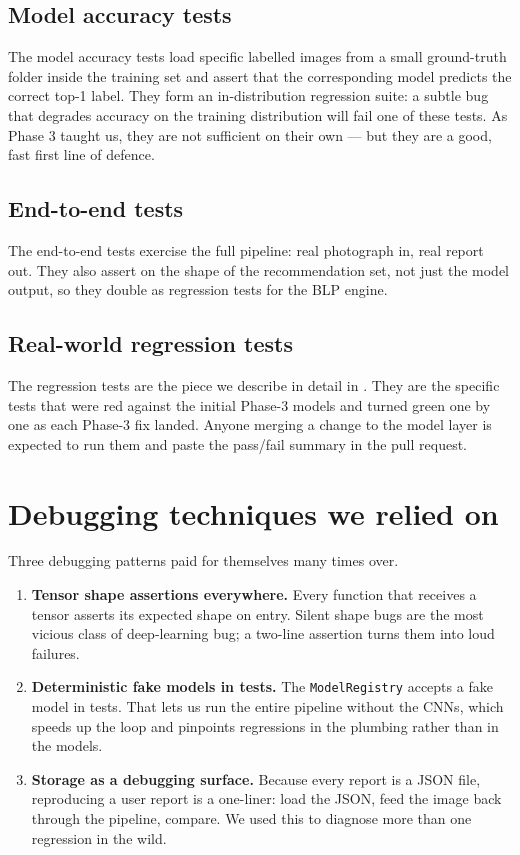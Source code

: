 \documentclass[11pt,a4paper,oneside]{report}
\begin{document}
\subsection{Model accuracy tests}
The model accuracy tests load specific labelled images from a
small ground-truth folder inside the training set and assert that
the corresponding model predicts the correct top-1 label. They
form an in-distribution regression suite: a subtle bug that
degrades accuracy on the training distribution will fail one of
these tests. As Phase 3 taught us, they are not sufficient on
their own --- but they are a good, fast first line of defence.

\subsection{End-to-end tests}
The end-to-end tests exercise the full pipeline: real photograph
in, real report out. They also assert on the shape of the
recommendation set, not just the model output, so they double as
regression tests for the BLP engine.

\subsection{Real-world regression tests}
The regression tests are the piece we describe in detail in
. They are the specific tests that were red
against the initial Phase-3 models and turned green one by one as
each Phase-3 fix landed. Anyone merging a change to the model
layer is expected to run them and paste the pass/fail summary in
the pull request.

\section{Debugging techniques we relied on}

Three debugging patterns paid for themselves many times over.

\begin{enumerate}
    \item \textbf{Tensor shape assertions everywhere.} Every
        function that receives a tensor asserts its expected shape
        on entry. Silent shape bugs are the most vicious class of
        deep-learning bug; a two-line assertion turns them into
        loud failures.
    \item \textbf{Deterministic fake models in tests.} The
        \texttt{ModelRegistry} accepts a fake model in tests. That
        lets us run the entire pipeline without the CNNs, which
        speeds up the loop and pinpoints regressions in the
        plumbing rather than in the models.
    \item \textbf{Storage as a debugging surface.} Because every
        report is a JSON file, reproducing a user report is a
        one-liner: load the JSON, feed the image back through the
        pipeline, compare. We used this to diagnose more than one
        regression in the wild.
\end{enumerate}
\end{document}
